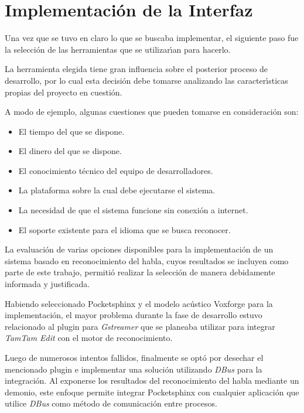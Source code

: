 \section{Implementaci\'on de la Interfaz}
\label{sec:implementacion-interfaz}

Una vez que se tuvo en claro lo que se buscaba implementar, el siguiente paso
fue la selecci\'on de las herramientas que se utilizar{\'\i}an para hacerlo. 

La herramienta elegida tiene gran influencia sobre el posterior proceso de
desarrollo, por lo cual esta decisi\'on debe tomarse analizando las caracter{\'\i}sticas
propias del proyecto en cuesti\'on.

A modo de ejemplo, algunas cuestiones que pueden tomarse en consideraci\'on son:

\begin{itemize}
	\item El tiempo del que se dispone.
	\item El dinero del que se dispone.
	\item El conocimiento t\'ecnico del equipo de desarrolladores.
	\item La plataforma sobre la cual debe ejecutarse el sistema.
	\item La necesidad de que el sistema funcione sin conexi\'on a internet.
	\item El soporte existente para el idioma que se busca reconocer.
\end{itemize}

La evaluaci\'on de varias opciones disponibles para la implementaci\'on de un sistema
basado en reconocimiento del habla, cuyos resultados se incluyen como parte de este
trabajo, permiti\'o realizar la selecci\'on de manera debidamente informada y justificada.

Habiendo seleccionado Pocketsphinx y el modelo ac\'ustico Voxforge para
la implementaci\'on, el mayor problema durante la fase de desarrollo estuvo relacionado
al plugin para \emph{Gstreamer} que se planeaba utilizar para integrar \emph{TamTam Edit}
con el motor de reconocimiento.

Luego de numerosos intentos fallidos, finalmente se opt\'o por desechar el mencionado plugin
e implementar una soluci\'on utilizando \emph{DBus} para la integraci\'on. Al exponerse los
resultados del reconocimiento del habla mediante un demonio, este enfoque permite integrar
Pocketsphinx con cualquier aplicaci\'on que utilice \emph{DBus} como m\'etodo de comunicaci\'on
entre procesos.
